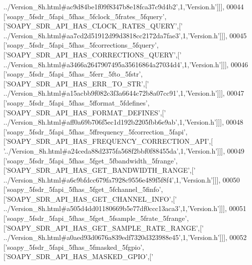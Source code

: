 \begin{DoxyCode}
{      ../Version\_8h.html#ac9d84be1f09f8347b8e18fca37c9d4b2'},1,\textcolor{stringliteral}{'Version.h'}]]],
00044   [\textcolor{stringliteral}{'soapy\_5fsdr\_5fapi\_5fhas\_5fclock\_5frates\_5fquery'},[\textcolor{stringliteral}{'SOAPY\_SDR\_API\_HAS\_CLOCK\_RATES\_QUERY'},[\textcolor{stringliteral}{'
      ../Version\_8h.html#aa7cd2d51912d99d3818cc2172da7fae3'},1,\textcolor{stringliteral}{'Version.h'}]]],
00045   [\textcolor{stringliteral}{'soapy\_5fsdr\_5fapi\_5fhas\_5fcorrections\_5fquery'},[\textcolor{stringliteral}{'SOAPY\_SDR\_API\_HAS\_CORRECTIONS\_QUERY'},[\textcolor{stringliteral}{'
      ../Version\_8h.html#a3466a2647907495a35616864a27034d4'},1,\textcolor{stringliteral}{'Version.h'}]]],
00046   [\textcolor{stringliteral}{'soapy\_5fsdr\_5fapi\_5fhas\_5ferr\_5fto\_5fstr'},[\textcolor{stringliteral}{'SOAPY\_SDR\_API\_HAS\_ERR\_TO\_STR'},[\textcolor{stringliteral}{'
      ../Version\_8h.html#a15acbb9f082c3f3a6644c72b8a07cc91'},1,\textcolor{stringliteral}{'Version.h'}]]],
00047   [\textcolor{stringliteral}{'soapy\_5fsdr\_5fapi\_5fhas\_5fformat\_5fdefines'},[\textcolor{stringliteral}{'SOAPY\_SDR\_API\_HAS\_FORMAT\_DEFINES'},[\textcolor{stringliteral}{'
      ../Version\_8h.html#aff0a69b706f5ec1d192b2205fbb6e9ab'},1,\textcolor{stringliteral}{'Version.h'}]]],
00048   [\textcolor{stringliteral}{'soapy\_5fsdr\_5fapi\_5fhas\_5ffrequency\_5fcorrection\_5fapi'},[\textcolor{stringliteral}{'SOAPY\_SDR\_API\_HAS\_FREQUENCY\_CORRECTION\_API'},[\textcolor{stringliteral}{
      '../Version\_8h.html#a24ceda88d2375fa568f2bbf0f88455da'},1,\textcolor{stringliteral}{'Version.h'}]]],
00049   [\textcolor{stringliteral}{'soapy\_5fsdr\_5fapi\_5fhas\_5fget\_5fbandwidth\_5frange'},[\textcolor{stringliteral}{'SOAPY\_SDR\_API\_HAS\_GET\_BANDWIDTH\_RANGE'},[\textcolor{stringliteral}{'
      ../Version\_8h.html#a6c9bfdcc679fa7928c9556e489f5f8f4'},1,\textcolor{stringliteral}{'Version.h'}]]],
00050   [\textcolor{stringliteral}{'soapy\_5fsdr\_5fapi\_5fhas\_5fget\_5fchannel\_5finfo'},[\textcolor{stringliteral}{'SOAPY\_SDR\_API\_HAS\_GET\_CHANNEL\_INFO'},[\textcolor{stringliteral}{'
      ../Version\_8h.html#a505d4dd01180669b5e77df0ccc13aca3'},1,\textcolor{stringliteral}{'Version.h'}]]],
00051   [\textcolor{stringliteral}{'soapy\_5fsdr\_5fapi\_5fhas\_5fget\_5fsample\_5frate\_5frange'},[\textcolor{stringliteral}{'SOAPY\_SDR\_API\_HAS\_GET\_SAMPLE\_RATE\_RANGE'},[\textcolor{stringliteral}{'
      ../Version\_8h.html#a0aed93d0676a839edf7320d323988e45'},1,\textcolor{stringliteral}{'Version.h'}]]],
00052   [\textcolor{stringliteral}{'soapy\_5fsdr\_5fapi\_5fhas\_5fmasked\_5fgpio'},[\textcolor{stringliteral}{'SOAPY\_SDR\_API\_HAS\_MASKED\_GPIO'},[\textcolor{stringliteral}{'
}
\end{DoxyCode}
